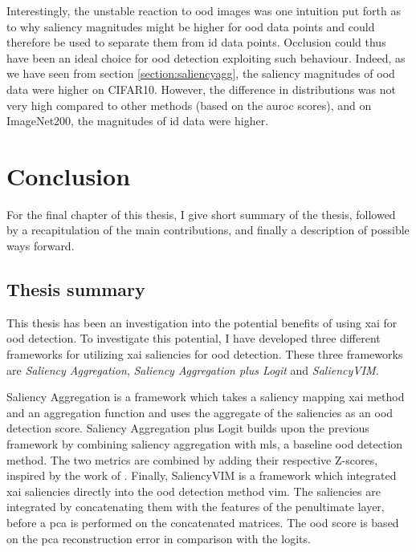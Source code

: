 \documentclass[UKenglish]{uiomasterthesis} %
\theoremstyle{definition}
\begin{document}
Interestingly, the unstable reaction to \ac{ood} images was one intuition put forth as to why saliency magnitudes might be higher for \ac{ood} data points and could therefore be used to separate them from \ac{id} data points. Occlusion could thus have been an ideal choice for \ac{ood} detection exploiting such behaviour. Indeed, as we have seen from section \ref{section:saliencyagg}, the saliency magnitudes of \ac{ood} data were higher on CIFAR10. However, the difference in distributions was not very high compared to other methods (based on the \ac{auroc} scores), and on ImageNet200, the magnitudes of \ac{id} data were higher.

\chapter{Conclusion} \label{chapter:conclusion}

For the final chapter of this thesis, I give short summary of the thesis, followed by a recapitulation of the main contributions, and finally a description of possible ways forward.

\section{Thesis summary}

This thesis has been an investigation into the potential benefits of using \ac{xai} for \ac{ood} detection. To investigate this potential, I have developed three different frameworks for utilizing \ac{xai} saliencies for \ac{ood} detection. These three frameworks are {\it Saliency Aggregation}, {\it Saliency Aggregation plus Logit} and {\it SaliencyVIM}.

Saliency Aggregation is a framework which takes a saliency mapping \ac{xai} method and an aggregation function and uses the aggregate of the saliencies as an \ac{ood} detection score. Saliency Aggregation plus Logit builds upon the previous framework by combining saliency aggregation with \ac{mls}, a baseline \ac{ood} detection method. The two metrics are combined by adding their respective Z-scores, inspired by the work of \cite{combood}. Finally, SaliencyVIM is a framework which integrated \ac{xai} saliencies directly into the \ac{ood} detection method \ac{vim}. The saliencies are integrated by concatenating them with the features of the penultimate layer, before a \ac{pca} is performed on the concatenated matrices. The \ac{ood} score is based on the \ac{pca} reconstruction error in comparison with the logits.
\end{document}
